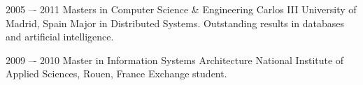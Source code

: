 
\begin{rlist}
  \item 
    \education
      {2005 –- 2011}
      {Masters in Computer Science \& Engineering}
      {Carlos III University of Madrid, Spain}
      {Major in Distributed Systems. Outstanding results in databases and artificial intelligence.}
  \item 
    \education
      {2009 –- 2010}
      {Master in Information Systems Architecture}
      {National Institute of Applied Sciences, Rouen, France}
      {Exchange student.} 
\end{rlist}

